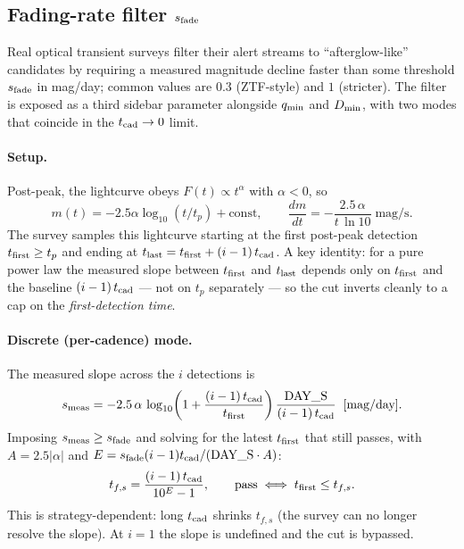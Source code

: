 \documentclass[11pt,a4paper]{article}
\begin{document}
\subsection{Fading-rate filter $s_{\rm fade}$}
\label{sec:filter_sfade}

Real optical transient surveys filter their alert streams to ``afterglow-like'' candidates by requiring a measured magnitude decline faster than some threshold $s_{\rm fade}$ in mag/day; common values are $0.3$ (ZTF-style) and $1$ (stricter). The filter is exposed as a third sidebar parameter alongside $q_{\rm min}$ and $D_{\rm min}$, with two modes that coincide in the $t_{\rm cad}\to 0$ limit.

\paragraph{Setup.} Post-peak, the lightcurve obeys $F(t)\propto t^\alpha$ with $\alpha<0$, so
\[
m(t)=-2.5\alpha\log_{10}(t/t_p)+\text{const},\qquad
\frac{dm}{dt}=-\frac{2.5\,\alpha}{t\,\ln 10}\;\text{mag/s}.
\]
The survey samples this lightcurve starting at the first post-peak detection $t_{\rm first}\ge t_p$ and ending at $t_{\rm last}=t_{\rm first}+(i-1)\,t_{\rm cad}$. A key identity: for a pure power law the measured slope between $t_{\rm first}$ and $t_{\rm last}$ depends only on $t_{\rm first}$ and the baseline $(i-1)\,t_{\rm cad}$ --- not on $t_p$ separately --- so the cut inverts cleanly to a cap on the \emph{first-detection time}.

\paragraph{Discrete (per-cadence) mode.} The measured slope across the $i$ detections is
\begin{equation}
\label{eq:s_meas_discrete}
s_{\rm meas}=-2.5\,\alpha\,\log_{10}\!\left(1+\frac{(i-1)\,t_{\rm cad}}{t_{\rm first}}\right)\frac{\text{DAY\_S}}{(i-1)\,t_{\rm cad}}\;\;\text{[mag/day]}.
\end{equation}
Imposing $s_{\rm meas}\ge s_{\rm fade}$ and solving for the latest $t_{\rm first}$ that still passes, with $A=2.5|\alpha|$ and $E=s_{\rm fade}(i-1)t_{\rm cad}/(\text{DAY\_S}\cdot A)$:
\begin{equation}
\label{eq:tfs_discrete}
t_{f,s}=\frac{(i-1)\,t_{\rm cad}}{10^E-1},\qquad\text{pass}\iff t_{\rm first}\le t_{f,s}.
\end{equation}
This is strategy-dependent: long $t_{\rm cad}$ shrinks $t_{f,s}$ (the survey can no longer resolve the slope). At $i=1$ the slope is undefined and the cut is bypassed.
\end{document}
